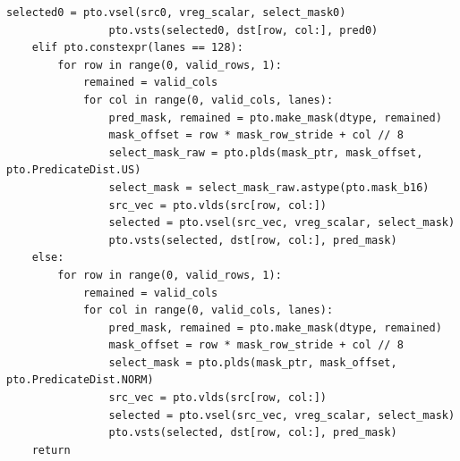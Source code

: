 \begin{lstlisting}[style=ptocode]
                selected0 = pto.vsel(src0, vreg_scalar, select_mask0)
                pto.vsts(selected0, dst[row, col:], pred0)
    elif pto.constexpr(lanes == 128):
        for row in range(0, valid_rows, 1):
            remained = valid_cols
            for col in range(0, valid_cols, lanes):
                pred_mask, remained = pto.make_mask(dtype, remained)
                mask_offset = row * mask_row_stride + col // 8
                select_mask_raw = pto.plds(mask_ptr, mask_offset, pto.PredicateDist.US)
                select_mask = select_mask_raw.astype(pto.mask_b16)
                src_vec = pto.vlds(src[row, col:])
                selected = pto.vsel(src_vec, vreg_scalar, select_mask)
                pto.vsts(selected, dst[row, col:], pred_mask)
    else:
        for row in range(0, valid_rows, 1):
            remained = valid_cols
            for col in range(0, valid_cols, lanes):
                pred_mask, remained = pto.make_mask(dtype, remained)
                mask_offset = row * mask_row_stride + col // 8
                select_mask = pto.plds(mask_ptr, mask_offset, pto.PredicateDist.NORM)
                src_vec = pto.vlds(src[row, col:])
                selected = pto.vsel(src_vec, vreg_scalar, select_mask)
                pto.vsts(selected, dst[row, col:], pred_mask)
    return
\end{lstlisting}
\Needspace{0.34\textheight}
